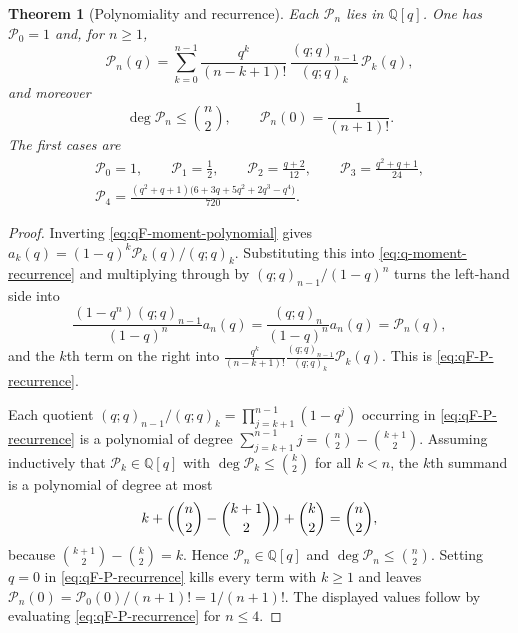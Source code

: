 \documentclass[11pt,oneside,openany]{book}
\newtheorem{theorem}{Theorem}[chapter]
\theoremstyle{definition}
\theoremstyle{remark}
\newcommand{\poch}[3]{(#1;#2)_{#3}}
\newcommand{\Q}{\mathbb Q}
\begin{document}
\begin{theorem}[Polynomiality and recurrence]\label{thm:qF-moment-polynomial}
Each $\mathcal P_n$ lies in $\Q[q]$.  One has $\mathcal P_0=1$ and, for $n\ge1$,
\begin{equation}\label{eq:qF-P-recurrence}
 \mathcal P_n(q)=\sum_{k=0}^{n-1}
 \frac{q^{k}}{(n-k+1)!}\,\frac{\poch qq{n-1}}{\poch qqk}\,\mathcal P_k(q),
\end{equation}
and moreover
\begin{equation}\label{eq:qF-P-degree}
 \deg\mathcal P_n\le\binom n2,
 \qquad
 \mathcal P_n(0)=\frac1{(n+1)!}.
\end{equation}
The first cases are
\begin{gather*}
 \mathcal P_0=1,\qquad
 \mathcal P_1=\frac12,\qquad
 \mathcal P_2=\frac{q+2}{12},\qquad
 \mathcal P_3=\frac{q^2+q+1}{24},\\
 \mathcal P_4=\frac{(q^2+q+1)\bigl(6+3q+5q^2+2q^3-q^4\bigr)}{720}.
\end{gather*}
\end{theorem}

\begin{proof}
Inverting \eqref{eq:qF-moment-polynomial} gives
$a_k(q)=(1-q)^k\mathcal P_k(q)/\poch qqk$.  Substituting this into
\eqref{eq:q-moment-recurrence} and multiplying through by
$\poch qq{n-1}/(1-q)^n$ turns the left-hand side into
\[
 \frac{(1-q^n)\poch qq{n-1}}{(1-q)^n}a_n(q)
 =\frac{\poch qqn}{(1-q)^n}a_n(q)
 =\mathcal P_n(q),
\]
and the $k$th term on the right into
$\frac{q^k}{(n-k+1)!}\frac{\poch qq{n-1}}{\poch qqk}\mathcal P_k(q)$.  This is
\eqref{eq:qF-P-recurrence}.

Each quotient $\poch qq{n-1}/\poch qqk=\prod_{j=k+1}^{n-1}(1-q^j)$ occurring in
\eqref{eq:qF-P-recurrence} is a polynomial of degree
$\sum_{j=k+1}^{n-1}j=\binom n2-\binom{k+1}2$.  Assuming inductively that
$\mathcal P_k\in\Q[q]$ with $\deg\mathcal P_k\le\binom k2$ for all $k<n$, the
$k$th summand is a polynomial of degree at most
\[
 k+\Bigl(\binom n2-\binom{k+1}2\Bigr)+\binom k2
 =\binom n2,
\]
because $\binom{k+1}2-\binom k2=k$.  Hence $\mathcal P_n\in\Q[q]$ and
$\deg\mathcal P_n\le\binom n2$.  Setting $q=0$ in \eqref{eq:qF-P-recurrence}
kills every term with $k\ge1$ and leaves
$\mathcal P_n(0)=\mathcal P_0(0)/(n+1)!=1/(n+1)!$.  The displayed values follow
by evaluating \eqref{eq:qF-P-recurrence} for $n\le4$.
\end{proof}
\end{document}

